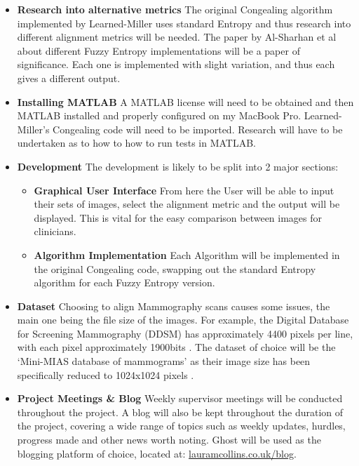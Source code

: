 \documentclass[11pt,fleqn,twoside]{article}
\begin{document}
\begin{itemize}
  \label{itm:task}
  \item\textbf{Research into alternative metrics} The original Congealing algorithm implemented by Learned-Miller uses standard Entropy and thus research into different alignment metrics will be needed. The paper by Al-Sharhan et al \cite{fuzzy-entropy} about different Fuzzy Entropy implementations will be a paper of significance. Each one is implemented with slight variation, and thus each gives a different output.
  \item\textbf{Installing MATLAB} A MATLAB license will need to be obtained and then MATLAB installed and properly configured on my MacBook Pro. Learned-Miller's Congealing code will need to be imported. Research will have to be undertaken as to how to how to run tests in MATLAB.
  \item\textbf{Development} The development is likely to be split into 2 major sections:
  \begin{itemize}
    \item\textbf{Graphical User Interface} From here the User will be able to input their sets of images, select the alignment metric and the output will be displayed. This is vital for the easy comparison between images for clinicians.
    \item\textbf{Algorithm Implementation} Each Algorithm will be implemented in the original Congealing code, swapping out the standard Entropy algorithm for each Fuzzy Entropy version.
  \end{itemize}
  \item\textbf{Dataset} Choosing to align Mammography scans causes some issues, the main one being the file size of the images. For example, the Digital Database for Screening Mammography (DDSM) has approximately 4400 pixels per line, with each pixel approximately 1900bits \cite{ddsm-paper}. The dataset of choice will be the `Mini-MIAS database of mammograms' as their image size has been specifically reduced to 1024x1024 pixels \cite{suckling1994mammographic}.
  \item\textbf{Project Meetings \& Blog} Weekly supervisor meetings will be conducted throughout the project. A blog will also be kept throughout the duration of the project, covering a wide range of topics such as weekly updates, hurdles, progress made and other news worth noting. Ghost will be used as the blogging platform of choice, located at: \url{lauramcollins.co.uk/blog}.
\end{itemize}
\end{document}
